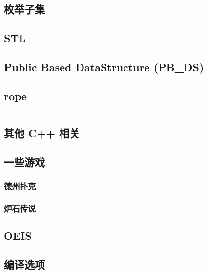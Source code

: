 \documentclass[a4paper, twoside]{article}
\begin{document}
\begin{multicols}{2}
			\subsection{枚举子集}
				
				
			\subsection{STL}
				

			\subsection{Public Based DataStructure (PB\_DS)}
				\label{pbds}
				

			\subsection{rope}
				\inputminted{cpp}{../src/misc/rope.cpp}
			
			\subsection{其他 C++ 相关}
				
			
			\subsection{一些游戏}
				\subsubsection{德州扑克}
					

				\subsubsection{炉石传说}
					

			\subsection{OEIS}
				\label{oeis}
				
			
			\subsection{编译选项}
				
				

\end{multicols}
\end{document}
